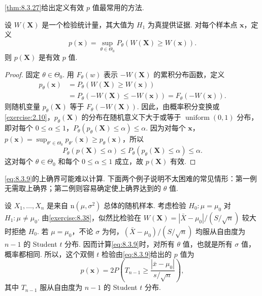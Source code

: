 \autoref{thm:8.3.27}给出定义有效 $p$ 值最常用的方法.
\begin{theorem}\label{thm:8.3.27}
设 $W(\boldsymbol X)$ 是一个检验统计量，其大值为 $H_1$ 为真提供证据. 对每个样本点 $\boldsymbol x$，定义
\begin{equation}\label{eq:8.3.9}p(\boldsymbol x)=\sup_{\theta\in\Theta_0}P_\theta(W(\boldsymbol X)\ge W(\boldsymbol x)).\end{equation}
则 $p(\boldsymbol X)$ 是有效 $p$ 值.
\end{theorem}
\begin{proof}
固定 $\theta\in\Theta_0$. 用 $F_\theta(w)$ 表示 $-W(\boldsymbol X)$ 的累积分布函数，定义
$$\begin{aligned}
p_\theta(\boldsymbol x)&=P_\theta(W(\boldsymbol X)\ge W(\boldsymbol x))\\
&=P_\theta(-W(\boldsymbol X)\le-W(\boldsymbol x))=F_\theta(-W(\boldsymbol x)).
\end{aligned}$$
则随机变量 $p_\theta(\boldsymbol X)$ 等于 $F_\theta(-W(\boldsymbol X))$. 因此，由概率积分变换或\autoref{exercise:2.10}，$p_\theta(\boldsymbol X)$ 的分布在随机意义下大于或等于 $\operatorname{uniform}(0,1)$ 分布，即对每个 $0\le\alpha\le1$，$P_\theta(p_\theta(\boldsymbol X)\le\alpha)\le\alpha$. 因为对每个 $\boldsymbol x$，$p(\boldsymbol x)=\sup_{\theta'\in\Theta_0}p_{\theta'}(\boldsymbol x)\ge p_\theta(\boldsymbol x)$，所以
$$P_\theta(p(\boldsymbol X)\le\alpha)\le P_\theta(p_\theta(\boldsymbol X)\le\alpha)\le\alpha.$$
这对每个 $\theta\in\Theta_0$ 和每个 $0\le\alpha\le1$ 成立，故 $p(\boldsymbol X)$ 有效.
\end{proof}
\eqref{eq:8.3.9}的上确界可能难以计算. 下面两个例子说明不太困难的常见情形：第一例无需取上确界；第二例则容易确定使上确界达到的 $\theta$ 值.
\begin{example}[双侧正态检验的 $p$ 值]\label{ex:8.3.28}
设 $X_1,\ldots,X_n$ 是来自 $\mathrm n(\mu,\sigma^2)$ 总体的随机样本. 考虑检验 $H_0:\mu=\mu_0$ 对 $H_1:\mu\ne\mu_0$. 由\autoref{exercise:8.38}，似然比检验在 $W(\boldsymbol X)=|\bar X-\mu_0|/(S/\sqrt n)$ 较大时拒绝 $H_0$. 若 $\mu=\mu_0$，不论 $\sigma$ 为何，$(\bar X-\mu_0)/(S/\sqrt n)$ 均服从自由度为 $n-1$ 的 Student $t$ 分布. 因而计算\eqref{eq:8.3.9}时，对所有 $\theta$ 值，也就是所有 $\sigma$ 值，概率都相同. 所以，这个双侧 $t$ 检验由\eqref{eq:8.3.9}给出的 $p$ 值为
$$p(\boldsymbol x)=2P\left(T_{n-1}\ge\frac{|\bar x-\mu_0|}{s/\sqrt n}\right),$$
其中 $T_{n-1}$ 服从自由度为 $n-1$ 的 Student $t$ 分布.
\end{example}
